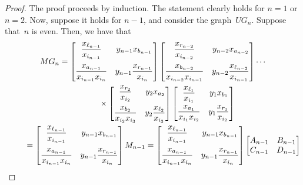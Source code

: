 \documentclass[pdftex]{sigma}%
\numberwithin{equation}{section}
\begin{document}
\begin{proof} The proof proceeds by induction. The statement clearly holds for $n = 1$ or $n = 2$. Now, suppose it holds for $n-1$, and consider the graph~$UG_n$. Suppose that~$n$ is even. Then, we have that
\begin{gather*}
MG_n = \begin{bmatrix}\dfrac{x_{\ell_{n-1}}}{x_{i_{n-1}}} & y_{n-1} x_{b_{n-1}} \vspace{2mm}\\ \dfrac{x_{a_{n-1}}}{x_{i_{n-1}}x_{i_n}} & y_{n-1} \dfrac{x_{r_{n-1}}}{x_{i_n}} \end{bmatrix} \begin{bmatrix} \dfrac{x_{r_{n-2}}}{x_{i_{n-2}}} & y_{n-2} x_{a_{n-2}} \vspace{2mm}\\ \dfrac{x_{b_{n-2}}}{x_{i_{n-2}}x_{i_{n-1}}} & y_{n-2} \dfrac{x_{\ell_{n-2}}}{x_{i_{n-1}}} \end{bmatrix} \cdots\\
\hphantom{MG_n=}{}\times
 \begin{bmatrix}\dfrac{x_{r_2}}{x_{i_2}} & y_2 x_{a_2} \vspace{2mm}\\ \dfrac{x_{b_2}}{x_{i_2}x_{i_3}} & y_2 \dfrac{x_{\ell_2}}{x_{i_3}} \end{bmatrix} \begin{bmatrix} \dfrac{x_{\ell_1}}{x_{i_1}} & y_1 x_{b_1} \vspace{1mm}\\ \dfrac{x_{a_1}}{x_{i_1}x_{i_2}} & y_1 \dfrac{x_{r_1}}{x_{i_2}} \end{bmatrix}
\\
\hphantom{MG_n}{}
= \begin{bmatrix}\dfrac{x_{\ell_{n-1}}}{x_{i_{n-1}}} & y_{n-1} x_{b_{n-1}} \vspace{2mm}\\ \dfrac{x_{a_{n-1}}}{x_{i_{n-1}}x_{i_n}} & y_{n-1} \dfrac{x_{r_{n-1}}}{x_{i_n}} \end{bmatrix} M_{n-1} = \begin{bmatrix}\dfrac{x_{\ell_{n-1}}}{x_{i_{n-1}}} & y_{n-1} x_{b_{n-1}} \vspace{2mm} \\ \dfrac{x_{a_{n-1}}}{x_{i_{n-1}}x_{i_n}} & y_{n-1} \dfrac{x_{r_{n-1}}}{x_{i_n}} \end{bmatrix} \begin{bmatrix} A_{n-1} & B_{n-1} \\ C_{n-1} & D_{n-1} \end{bmatrix}

\end{gather*}
\end{proof}
\end{document}
